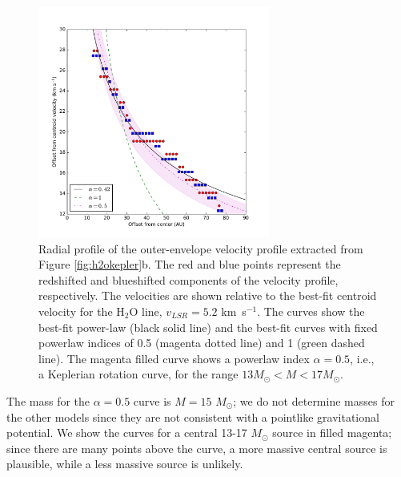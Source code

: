 \documentclass[twocolumn]{aastex61}
\newcommand{\msun}{\ensuremath{M_{\odot}}\xspace}			%
\newcommand{\water}{H$_{2}$O\xspace}		%
\newcommand{\kms}{\textrm{km~s}\ensuremath{^{-1}}\xspace}	%
\begin{document}


\begin{figure}[!htp]
\includegraphics[scale=1,width=3.0in]{figures/bestfit_powerlaw_H2O_kepler_SeifriedPlot_0.01arcsec.pdf}
\caption{Radial profile of the outer-envelope velocity profile extracted from
Figure \ref{fig:h2okepler}b.  The red and blue points represent the redshifted
and blueshifted components of the velocity profile, respectively.  The velocities
are shown relative to the best-fit centroid velocity for the \water line,
$v_{LSR}=5.2$ \kms.  The curves show the best-fit power-law (black solid line)
and the best-fit curves with fixed powerlaw indices of 0.5 (magenta dotted line)
and 1 (green dashed line).  The magenta filled curve shows a powerlaw index
$\alpha=0.5$, i.e., a Keplerian rotation curve, for the range $13 \msun < M <
17 \msun$. }
\label{fig:h2opowerlaws}
\end{figure}




The mass for the $\alpha=0.5$ curve is $M=15$ \msun; we do not determine
masses for the other models since they are not consistent with a pointlike
gravitational potential.  We show the curves for a central 13-17 \msun source
in filled magenta; since there are many points above the curve, a more massive
central source is plausible, while a less massive source is unlikely.
\end{document}
